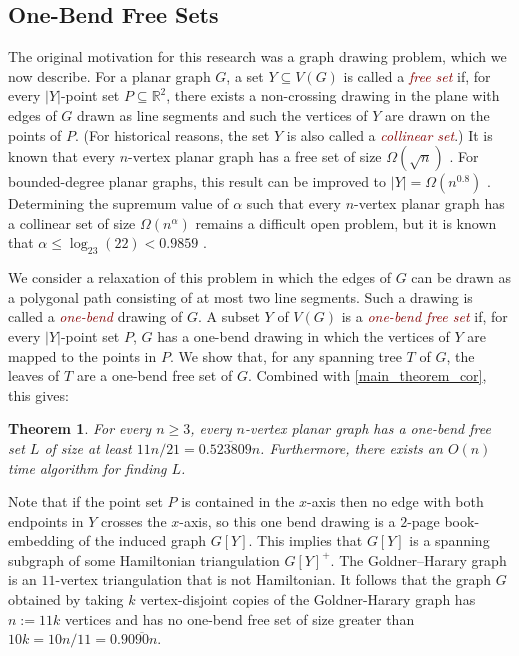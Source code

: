 \documentclass{article}
\newcommand{\R}{\mathbb{R}}
\newtheorem{thm}{Theorem}
\newcommand{\defin}[1]{\emph{\textcolor{Maroon}{#1}}}
\theoremstyle{definition}
\begin{document}
\subsection{One-Bend Free Sets}

The original motivation for this research was a graph drawing problem, which we now describe.  For a planar graph $G$, a set $Y\subseteq V(G)$ is called a \defin{free set} if, for every $|Y|$-point set $P\subseteq\R^2$, there exists a non-crossing drawing in the plane with edges of $G$ drawn as line segments and such the vertices of $Y$ are drawn on the points of $P$.  (For historical reasons, the set $Y$ is also called a \defin{collinear set}.)  It is known that every $n$-vertex planar graph has a free set of size $\Omega(\sqrt{n})$ \cite{bose.dujmovic:polynomial,dujmovic:utility,dujmovic.frati.ea:every}.
For bounded-degree planar graphs, this result can be improved to $|Y|=\Omega(n^{0.8})$ \cite{dujmovic.morin:dual}.  Determining the supremum value of $\alpha$ such that every $n$-vertex planar graph has a collinear set of size $\Omega(n^{\alpha})$ remains a difficult open problem, but it is known that $\alpha \le \log_{23}(22)<0.9859$ \cite{ravsky.verbitsky:collinear}.

We consider a relaxation of this problem in which the edges of $G$ can be drawn as a polygonal path consisting of at most two line segments.  Such a drawing is called a \defin{one-bend} drawing of $G$. A subset $Y$ of $V(G)$ is a \defin{one-bend free set} if, for every $|Y|$-point set $P$,  $G$ has a one-bend drawing in which the vertices of $Y$ are mapped to the points in $P$.  We show that, for any spanning tree $T$ of $G$, the leaves of $T$ are a one-bend free set of $G$.  Combined with \cref{main_theorem_cor}, this gives:

\begin{thm}\label{one_bend_collinear_thm}
  For every $n\ge 3$, every $n$-vertex planar graph has a one-bend free set $L$ of size at least $11n/21=0.\overline{523809}n$.  Furthermore, there exists an $O(n)$ time algorithm for finding $L$.
\end{thm}

Note that if the point set $P$ is contained in the $x$-axis then no edge with both endpoints in $Y$ crosses the $x$-axis, so this one bend drawing is a $2$-page book-embedding of the induced graph $G[Y]$. This implies that $G[Y]$ is a spanning subgraph of some Hamiltonian triangulation $G[Y]^+$.  The Goldner–Harary graph is an $11$-vertex triangulation that is not Hamiltonian. It follows that the graph $G$ obtained by taking $k$ vertex-disjoint copies of the Goldner-Harary graph has $n:=11k$ vertices and has no one-bend free set of size greater than $10k=10n/11=0.90\overline{90}n$.
\end{document}
